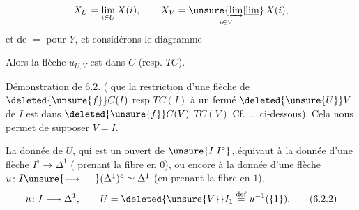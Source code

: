 \[
 X_U=\lim_{i\in U}X(i),\qquad X_V=\underset{i\in V}{\unsure{\underrightarrow{\lim}|\underline{\lim}}}\,X(i),
\]
et de $=$ pour $Y$, et considérons le
diagramme


Alors la flèche $u_{U,V}$ est dans $C$ (resp. $TC$).

Démonstration de 6.2. ( 
que la restriction d'une flèche de
$\deleted{\unsure{f}} C(I)$ resp $TC(I)$ à un fermé
 $\deleted{\unsure{U}}V$ de $I$  est dans $\deleted{\unsure{f}} C(V)$ 
$TC(V)$ Cf. \ldots\ ci-dessous). Cela
nous permet de supposer $V=I$.

La donnée de $U$, qui est un ouvert
de $\unsure{I|I^\circ}$, équivaut à la donnée d'une
flèche  $I^\circ\longrightarrow\Delta^1$ ( prenant la
fibre en $0$), ou encore à la donnée
d'une flèche $u\colon I\unsure{\longrightarrow|\text{---}}(\Delta^1)^\circ\simeq\Delta^1$
(en prenant la fibre en $1$), 
\[
 u\colon I\longrightarrow\Delta^1,\qquad
 U=\deleted{\unsure{V}}I_1\overset{\mathrm{def}}{=}u^{-1}(\{1\}).\tag*{(6.2.2)}
\]

